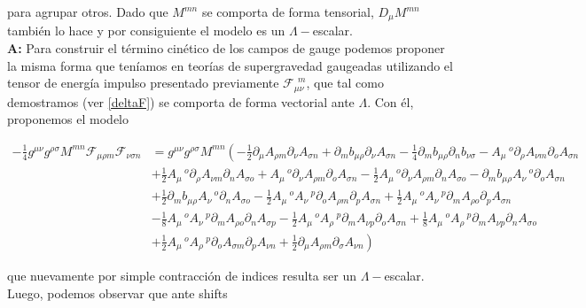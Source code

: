 \documentclass{article}
\numberwithin{equation}{section}
\begin{document}
para agrupar otros. Dado que $ M^{m n} $ se comporta de forma tensorial, $ D_{\mu}M^{m n} $ también lo hace y por consiguiente el modelo es un $ \Lambda-$escalar.\\

\textbf{A:} Para construir el término cinético de los campos de gauge podemos proponer la misma forma que teníamos en teorías de supergravedad gaugeadas utilizando el tensor de energía impulso presentado previamente $ \mathcal{F}_{\mu \nu}^{\ \ m} $, que tal como demostramos (ver \ref{deltaF}) se comporta de forma vectorial ante $ \Lambda $. Con él, proponemos el modelo

\begin{equation}\label{MFF}
\begin{aligned}
- \frac{1}{4}g^{\mu \nu} g^{\rho \sigma} M^{m n} \mathcal{F}_{\mu \rho m} \mathcal{F}_{\nu \sigma n} &=
g^{\mu \nu} g^{\rho \sigma} M^{m n} \left( - \frac{1}{2}\partial_{\mu}A_{\rho m} \partial_{\nu}A_{\sigma n}+\partial_{m}b_{\mu \rho} \partial_{\nu}A_{\sigma n} - \frac{1}{4}\partial_{m}b_{\mu \rho} \partial_{n}b_{\nu \sigma}-A_{\mu}\,^{o} \partial_{\rho}A_{\nu m} \partial_{o}A_{\sigma n} \right.\\
&+\frac{1}{2}A_{\mu}\,^{o} \partial_{\rho}A_{\nu m} \partial_{n}A_{\sigma o}+A_{\mu}\,^{o} \partial_{\nu}A_{\rho m} \partial_{o}A_{\sigma n} - \frac{1}{2}A_{\mu}\,^{o} \partial_{\nu}A_{\rho m} \partial_{n}A_{\sigma o}-\partial_{m}b_{\mu \rho} A_{\nu}\,^{o} \partial_{o}A_{\sigma n}\\
&+\frac{1}{2}\partial_{m}b_{\mu \rho} A_{\nu}\,^{o} \partial_{n}A_{\sigma o} - \frac{1}{2}A_{\mu}\,^{o} A_{\nu}\,^{p} \partial_{o}A_{\rho m} \partial_{p}A_{\sigma n} +\frac{1}{2}A_{\mu}\,^{o} A_{\nu}\,^{p} \partial_{m}A_{\rho o} \partial_{p}A_{\sigma n}\\
&- \frac{1}{8}A_{\mu}\,^{o} A_{\nu}\,^{p} \partial_{m}A_{\rho o} \partial_{n}A_{\sigma p} - \frac{1}{2}A_{\mu}\,^{o} A_{\rho}\,^{p} \partial_{m}A_{\nu p} \partial_{o}A_{\sigma n}+\frac{1}{8}A_{\mu}\,^{o} A_{\rho}\,^{p} \partial_{m}A_{\nu p} \partial_{n}A_{\sigma o}\\
& \left. +\frac{1}{2}A_{\mu}\,^{o} A_{\rho}\,^{p} \partial_{o}A_{\sigma m} \partial_{p}A_{\nu n} +\frac{1}{2} \partial_{\mu}A_{\rho m} \partial_{\sigma}A_{\nu n} \right)
\end{aligned}
\end{equation}

que nuevamente por simple contracción de indices resulta ser un $ \Lambda-$escalar. Luego, podemos observar que ante shifts
\end{document}
